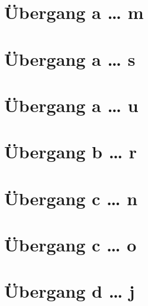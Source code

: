 \documentclass[a4paper,landscape]{article}
\begin{document}

\hspace*{-1ex}
\newpage

\section{Übergang a … m }

\hspace*{-1ex}
\newpage

\section{Übergang a … s }

\hspace*{-1ex}
\newpage

\section{Übergang a … u }

\hspace*{-1ex}
\newpage

\section{Übergang b … r }

\hspace*{-1ex}
\newpage

\section{Übergang c … n }

\hspace*{-1ex}
\newpage

\section{Übergang c … o }

\hspace*{-1ex}
\newpage

\section{Übergang d … j }

\hspace*{-1ex}
\newpage
\end{document}
